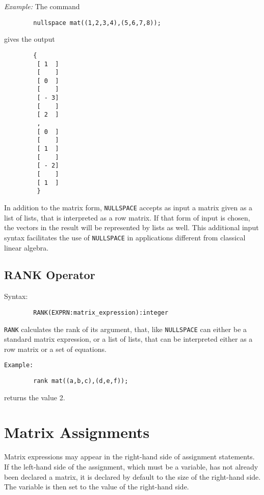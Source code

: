 \textit{Example:} The command
\begin{verbatim}
        nullspace mat((1,2,3,4),(5,6,7,8));
\end{verbatim}
   gives the output
 
\begin{verbatim}
        {
         [ 1  ]
         [    ]
         [ 0  ]
         [    ]
         [ - 3]
         [    ]
         [ 2  ]
         ,
         [ 0  ]
         [    ]
         [ 1  ]
         [    ]
         [ - 2]
         [    ]
         [ 1  ]
         }
\end{verbatim}
 
In addition to the {\REDUCE} matrix form, \texttt{NULLSPACE} accepts as input a
matrix given as a list of lists, that is interpreted as a row matrix.  If
that form of input is chosen, the vectors in the result will be
represented by lists as well.  This additional input syntax facilitates
the use of \texttt{NULLSPACE} in applications different from classical linear
algebra.

\subsection{RANK Operator}
\hypertarget{operator:RANK}{}
 
Syntax:
\begin{verbatim}
        RANK(EXPRN:matrix_expression):integer
\end{verbatim}
\texttt{RANK} calculates the rank of its argument, that, like \texttt{NULLSPACE}
can either be a standard matrix expression, or a list of lists, that can
be interpreted either as a row matrix or a set of equations.

\texttt{Example:}

\begin{verbatim}
        rank mat((a,b,c),(d,e,f));
\end{verbatim}
returns the value 2.

\section{Matrix Assignments} 

Matrix expressions may appear in the right-hand side of assignment
statements. If the left-hand side of the assignment, which must be a
variable, has not already been declared a matrix, it is declared by default
to the size of the right-hand side. The variable is then set to the value
of the right-hand side.

